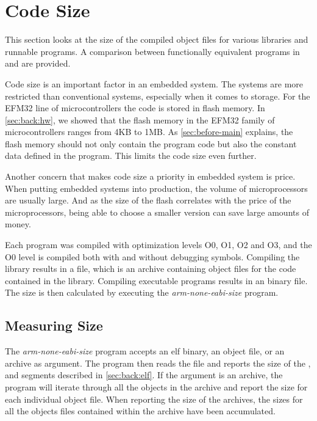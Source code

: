 \section{Code Size}
\label{sec:res:code-size}

This section looks at the size of the compiled object files for various {\rust} libraries and runnable programs.
A comparison between functionally equivalent programs in {\C} and {\rust} are provided.

Code size is an important factor in an embedded system.
The systems are more restricted than conventional systems, especially when it comes to storage.
For the EFM32 line of microcontrollers the code is stored in flash memory.
In \autoref{sec:back:hw}, we showed that the flash memory in the EFM32 family of microcontrollers ranges from 4KB to 1MB.
As \autoref{sec:before-main} explains, the flash memory should not only contain the program code but also the constant data defined in the program.
This limits the code size even further.

Another concern that makes code size a priority in embedded system is price.
When putting embedded systems into production, the volume of microprocessors are usually large.
And as the size of the flash correlates with the price of the microprocessors, being able to choose a smaller version can save large amounts of money.

Each program was compiled with optimization levels O0, O1, O2 and O3, and the O0 level is compiled both with and without debugging symbols.
Compiling the library results in a  file, which is an archive containing object files for the code contained in the library.
Compiling executable programs results in an {\elf} binary file.
The size is then calculated by executing the \emph{arm-none-eabi-size} program.

\subsection{Measuring Size}
\label{sec:measure-size}

The \emph{arm-none-eabi-size} program accepts an elf binary, an object file, or an archive as argument.
The program then reads the file and reports the size of the ,  and  segments described in \autoref{sec:back:elf}.
If the argument is an archive, the program will iterate through all the objects in the archive and report the size for each individual object file.
When reporting the size of the archives, the sizes for all the objects files contained within the archive have been accumulated.

